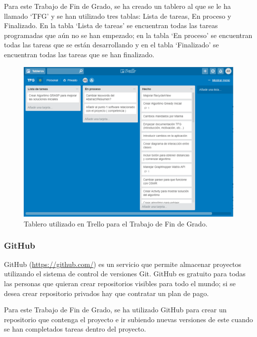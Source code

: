Para este Trabajo de Fin de Grado, se ha creado un tablero al que se le ha llamado \enquote*{TFG} y se han utilizado tres tablas: Lista de tareas, En proceso y Finalizado. En la tabla \enquote*{Lista de tareas} se encuentran todas las tareas programadas que aún no se han empezado; en la tabla \enquote*{En proceso} se encuentran todas las tareas que se están desarrollando y en el tabla \enquote*{Finalizado} se encuentran todas las tareas que se han finalizado.\newline

\begin{figure}[H]
	\centering
	\includegraphics[scale=0.5]{imagenes/trello_example}
	\caption{Tablero utilizado en Trello para el Trabajo de Fin de Grado.}
	\label{fig:trello}
\end{figure}

\subsubsection{GitHub}
GitHub \cite{github} (\href{https://github.com/}{https://github.com/}) es un servicio que permite almacenar proyectos utilizando el sistema de control de versiones Git. GitHub es gratuito para todas las personas que quieran crear repositorios visibles para todo el mundo; si se desea crear repositorio privados hay que contratar un plan de pago.\newline

Para este Trabajo de Fin de Grado, se ha utilizado GitHub para crear un repositorio que contenga el proyecto e ir subiendo nuevas versiones de este cuando se han completados tareas dentro del proyecto.\newline

